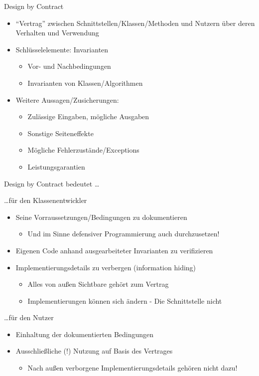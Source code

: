 \begin{frame}{Design by Contract}
	\begin{itemize}
		\item \enquote{Vertrag} zwischen Schnittstellen/Klassen/Methoden und Nutzern über deren Verhalten und Verwendung
		\item Schlüsselelemente: Invarianten
		\begin{itemize}
			\item Vor- und Nachbedingungen
			\item Invarianten von Klassen/Algorithmen
		\end{itemize}
		\item Weitere Aussagen/Zusicherungen:
		\begin{itemize}
			\item Zulässige Eingaben, mögliche Ausgaben
			\item Sonstige Seiteneffekte
			\item Mögliche Fehlerzustände/Exceptions
			\item Leistungsgarantien
		\end{itemize}
	\end{itemize}
\end{frame}

\begin{frame}{Design by Contract bedeutet \dots}
	\begin{block}{\dots für den Klassenentwickler}
		\begin{itemize}
			\item Seine Vorraussetzungen/Bedingungen zu dokumentieren
			\begin{itemize}
				\item Und im Sinne defensiver Programmierung auch durchzusetzen!
			\end{itemize}
			\item Eigenen Code anhand ausgearbeiteter Invarianten zu verifizieren
			\item Implementierungsdetails zu verbergen (information hiding)
			\begin{itemize}
				\item Alles von außen Sichtbare gehört zum Vertrag
				\item Implementierungen können sich ändern - Die Schnittstelle nicht
			\end{itemize}
		\end{itemize}
	\end{block}
	\begin{block}{\dots für den Nutzer}
		\begin{itemize}
			\item Einhaltung der dokumentierten Bedingungen
			\item Ausschließliche (!) Nutzung auf Basis des Vertrages
			\begin{itemize}
				\item Nach außen verborgene Implementierungsdetails gehören nicht dazu!
			\end{itemize}
		\end{itemize}
	\end{block}
\end{frame}

